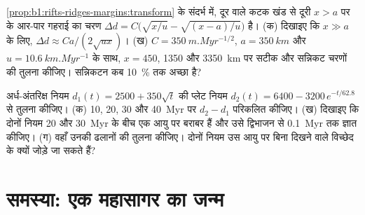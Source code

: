 \begin{exercise}[$\star\star\star$]\label{exo:b1:rifts-ridges-margins:11}
\cref{prop:b1:rifts-ridges-margins:transform} के संदर्भ में, दूर वाले कटक खंड से दूरी $x > a$ पर  के आर-पार गहराई का चरण $\Delta d = C\bigl(\sqrt{x/u} - \sqrt{(x - a)/u}\bigr)$ है। (क) दिखाइए कि $x \gg a$ के लिए, $\Delta d \approx Ca/(2\sqrt{ux})$। (ख) $C = \qty{350}{m.Myr^{-1/2}}$, $a = \qty{350}{km}$ और $u = \qty{10.6}{km.Myr^{-1}}$ के साथ, $x = 450$, 1350 और \qty{3350}{km} पर सटीक और सन्निकट चरणों की तुलना कीजिए। सन्निकटन कब \qty{10}{\percent} तक अच्छा है?
\end{exercise}

\begin{exercise}[$\star\star\star$]\label{exo:b1:rifts-ridges-margins:12}
अर्ध-अंतरिक्ष नियम $d_1(t) = 2500 + 350\sqrt t$ की प्लेट नियम $d_2(t) = 6400 - 3200\,e^{-t/62.8}$ से तुलना कीजिए। (क) 10, 20, 30 और \qty{40}{Myr} पर $d_2 - d_1$ परिकलित कीजिए। (ख) दिखाइए कि दोनों नियम 20 और \qty{30}{Myr} के बीच एक आयु पर बराबर हैं और उसे द्विभाजन से \qty{0.1}{Myr} तक ज्ञात कीजिए। (ग) वहाँ उनकी ढलानों की तुलना कीजिए। दोनों नियम उस आयु पर बिना दिखने वाले विच्छेद के क्यों जोड़े जा सकते हैं?
\end{exercise}

\section{समस्या: एक महासागर का जन्म}

